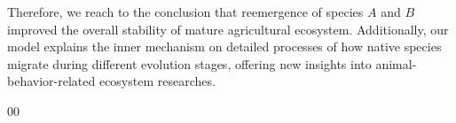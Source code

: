 \documentclass[12pt]{article}
\begin{document}
	Therefore, we reach to the conclusion that reemergence of species $A$ and $B$ improved the overall stability of mature agricultural ecosystem. Additionally, our model explains the inner mechanism on detailed processes of how native species migrate during different evolution stages, offering new insights into animal-behavior-related ecosystem researches.
	
	
	
	\newpage
	\begin{thebibliography}{00}
		
		
		
		
		
		
	\end{thebibliography}
\end{document}
